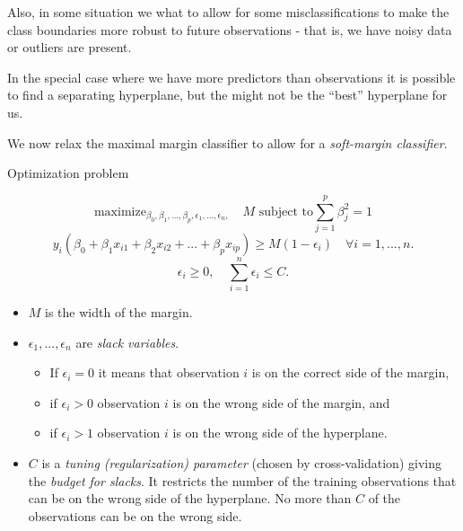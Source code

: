 \documentclass[ignorenonframetext,]{beamer}
\providecommand{\tightlist}{%
  \setlength{\itemsep}{0pt}\setlength{\parskip}{0pt}}
\begin{document}
\begin{frame}

Also, in some situation we what to allow for some misclassifications to
make the class boundaries more robust to future observations - that is,
we have noisy data or outliers are present.

In the special case where we have more predictors than observations it
is possible to find a separating hyperplane, but the might not be the
``best'' hyperplane for us.

We now relax the maximal margin classifier to allow for a
\emph{soft-margin classifier}.

\end{frame}

\begin{frame}

\begin{block}{Optimization problem}

\[\mathrm{maximize}_{\beta_0,\beta_1,...,\beta_p,\epsilon_1,...,\epsilon_n,} \quad M \text{ subject to} \sum_{j=1}^p \beta_j^2=1\]
\[y_i(\beta_0+\beta_1 x_{i1}+\beta_2 x_{i2}+...+\beta_p x_{ip})\geq M(1-\epsilon_i) \quad  \forall i=1,...,n.\]
\[\epsilon_i\geq 0, \quad \sum_{i=1}^n \epsilon_i \leq C.\]

\end{block}

\end{frame}

\begin{frame}

\begin{itemize}
\tightlist
\item
  \(M\) is the width of the margin.
\item
  \(\epsilon_1,...,\epsilon_n\) are \emph{slack variables}.

  \begin{itemize}
  \tightlist
  \item
    If \(\epsilon_i=0\) it means that observation \(i\) is on the
    correct side of the margin,
  \item
    if \(\epsilon_i>0\) observation \(i\) is on the wrong side of the
    margin, and
  \item
    if \(\epsilon_i>1\) observation \(i\) is on the wrong side of the
    hyperplane.
  \end{itemize}
\item
  \(C\) is a \emph{tuning (regularization) parameter} (chosen by
  cross-validation) giving the \emph{budget for slacks}. It restricts
  the number of the training observations that can be on the wrong side
  of the hyperplane. No more than \(C\) of the observations can be on
  the wrong side.
\end{itemize}

\end{frame}
\end{document}

